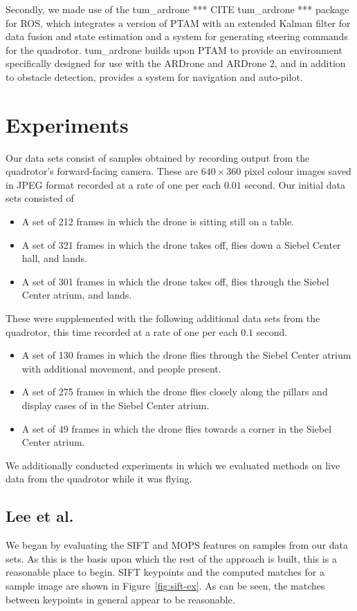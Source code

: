\documentclass{acmsiggraph}
\begin{document}
Secondly, we made use of the tum\_ardrone *** CITE tum\_ardrone *** package for ROS, which integrates a version of PTAM with an extended Kalman filter for data fusion and state estimation and a system for generating steering commands for the quadrotor. tum\_ardrone builds upon PTAM to provide an environment specifically designed for use with the ARDrone and ARDrone 2, and in addition to obstacle detection, provides a system for navigation and auto-pilot.

\section{Experiments}
Our data sets consist of samples obtained by recording output from the quadrotor's forward-facing camera. These are $640 \times 360$ pixel colour images saved in JPEG format recorded at a rate of one per each $0.01$ second. Our initial data sets consisted of
\begin{itemize}
\item A set of 212 frames in which the drone is sitting still on a table.
\item A set of 321 frames in which the drone takes off, flies down a Siebel Center hall, and lands.
\item A set of 301 frames in which the drone takes off, flies through the Siebel Center atrium, and lands.
\end{itemize}
These were supplemented with the following additional data sets from the quadrotor, this time recorded at a rate of one per each $0.1$ second.
\begin{itemize}
\item A set of 130 frames in which the drone flies through the Siebel Center atrium with additional movement, and people present.
\item A set of 275 frames in which the drone flies closely along the pillars and display cases of in the Siebel Center atrium.
\item A set of 49 frames in which the drone flies towards a corner in the Siebel Center atrium.
\end{itemize}

We additionally conducted experiments in which we evaluated methods on live data from the quadrotor while it was flying.

\subsection{Lee et al.}
We began by evaluating the SIFT and MOPS features on samples from our data sets. As this is the basis upon which the rest of the approach is built, this is a reasonable place to begin. SIFT keypoints and the computed matches for a sample image are shown in Figure~\ref{fig:sift-ex}. As can be seen, the matches between keypoints in general appear to be reasonable.
\end{document}
